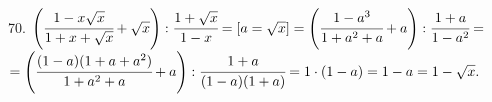 70. $\left(\cfrac{1-x\sqrt{x}}{1+x+\sqrt{x}}+\sqrt{x}\right): \cfrac{1+\sqrt{x}}{1-x}=[a=\sqrt{x}]=
\left(\cfrac{1-a^3}{1+a^2+a}+a\right): \cfrac{1+a}{1-a^2}=$\\$=\left(\cfrac{(1-a)(1+a+a^2)}{1+a^2+a}+a\right): \cfrac{1+a}{(1-a)(1+a)}=
1\cdot(1-a)=1-a=1-\sqrt{x}.$\\
